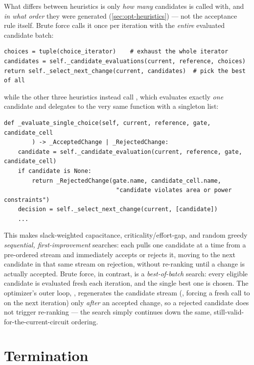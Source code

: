 What differs between heuristics is only \emph{how many} candidates
 is called with, and \emph{in what order}
they were generated (\cref{sec:opt-heuristics}) --- not the acceptance
rule itself. Brute force calls it once per iteration with the
\emph{entire} evaluated candidate batch:

\begin{lstlisting}[style=pythonstyle, numbers=none]
choices = tuple(choice_iterator)    # exhaust the whole iterator
candidates = self._candidate_evaluations(current, reference, choices)
return self._select_next_change(current, candidates)  # pick the best of all
\end{lstlisting}

while the other three heuristics instead call
, which evaluates exactly \emph{one}
candidate and delegates to the very same function with a singleton list:

\begin{lstlisting}[style=pythonstyle, numbers=none]
def _evaluate_single_choice(self, current, reference, gate, candidate_cell
        ) -> _AcceptedChange | _RejectedChange:
    candidate = self._candidate_evaluation(current, reference, gate, candidate_cell)
    if candidate is None:
        return _RejectedChange(gate.name, candidate_cell.name,
                                "candidate violates area or power constraints")
    decision = self._select_next_change(current, [candidate]) 
    ...
\end{lstlisting}

This makes slack-weighted capacitance, criticality/effort-gap, and random
greedy \emph{sequential, first-improvement} searches: each pulls one
candidate at a time from a pre-ordered stream and immediately accepts or
rejects it, moving to the next candidate in that same stream on rejection,
without re-ranking until a change is actually accepted. Brute force, in
contrast, is a \emph{best-of-batch} search: every eligible candidate is
evaluated fresh each iteration, and the single best one is chosen. The
optimizer's outer loop, , regenerates the candidate stream
(, forcing a fresh call to
 on the next iteration) only \emph{after} an
accepted change, so a rejected candidate does not trigger re-ranking ---
the search simply continues down the same, still-valid-for-the-current-circuit
ordering.

\section{Termination}
\label{sec:opt-termination}

